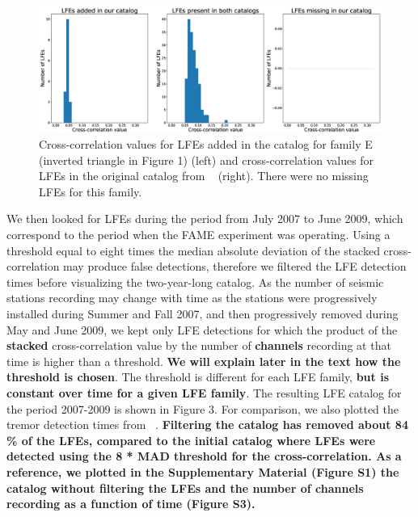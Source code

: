 \documentclass[draft]{agujournal2019}
\begin{document}
\begin{figure}
\noindent\includegraphics[width=\textwidth, trim={7.5cm 1cm 28cm 2cm},clip]{figures/hist.eps}
\caption{Cross-correlation values for LFEs added in the catalog for family E (inverted triangle in Figure 1) (left) and cross-correlation values for LFEs in the original catalog from ~ (right). There were no missing LFEs for this family.}
\label{pngfiguresample}
\end{figure}

We then looked for LFEs during the period from July 2007 to June 2009, which correspond to the period when the FAME experiment was operating. Using a threshold equal to eight times the median absolute deviation of the stacked cross-correlation may produce false detections, therefore we filtered the LFE detection times before visualizing the two-year-long catalog. As the number of seismic stations recording may change with time as the stations were progressively installed during Summer and Fall 2007, and then progressively removed during May and June 2009, we kept only LFE detections for which the product of the \textbf{stacked} cross-correlation value by the number of \textbf{channels} recording at that time is higher than a threshold. \textbf{We will explain later in the text how the threshold is chosen}. The threshold is different for each LFE family, \textbf{but is constant over time for a given LFE family}. The resulting LFE catalog for the period 2007-2009 is shown in Figure 3. For comparison, we also plotted the tremor detection times from ~. \textbf{Filtering the catalog has removed about 84 \% of the LFEs, compared to the initial catalog where LFEs were detected using the 8 * MAD threshold for the cross-correlation. As a reference, we plotted in the Supplementary Material (Figure S1) the catalog without filtering the LFEs and the number of channels recording as a function of time (Figure S3).} \\
\end{document}

